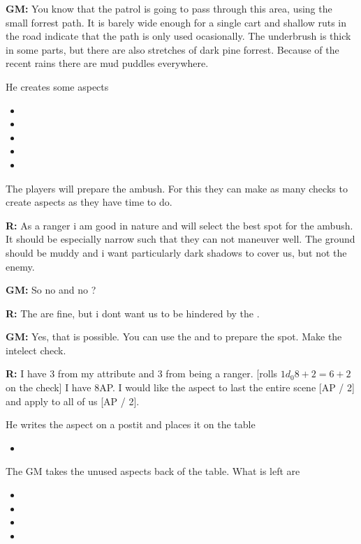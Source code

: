 \documentclass[11pt]{article}
\begin{document}
{\textbf{GM:} You know that the patrol is going to pass through this area, using the small forrest path. It is barely wide enough for a single cart and shallow ruts in the road indicate that the path is only used ocasionally. The underbrush is thick in some parts, but there are also stretches of dark pine forrest. Because of the recent rains there are mud puddles everywhere.

He creates some aspects
\begin{itemize}
\item {}
\item {}
\item {}
\item {}
\item {}
\end{itemize}

The players will prepare the ambush. For this they can make as many checks to create aspects as they have time to do.

\textbf{R:} As a ranger i am good in nature and will select the best spot for the ambush. It should be especially narrow such that they can not maneuver well. The ground should be muddy and i want particularly dark shadows to cover us, but not the enemy.

\textbf{GM:} So no  and no ?

\textbf{R:} The  are fine, but i dont want us to be hindered by the .

\textbf{GM:} Yes, that is possible. You can use the  and  to prepare the spot. Make the intelect check.

\textbf{R:} I have 3 from my attribute and 3 from being a ranger. [rolls \(1 d_0 8 + 2 = 6 + 2\) on the check] I have 8AP. I would like the aspect to last the entire scene [AP / 2] and apply to all of us [AP / 2].

He writes the aspect on a postit and places it on the table
\begin{itemize}
\item {}
\end{itemize}
The GM takes the unused aspects back of the table. What is left are
\begin{itemize}
\item {}
\item {}
\item {}
\item {}
\end{itemize}

}
\end{document}
